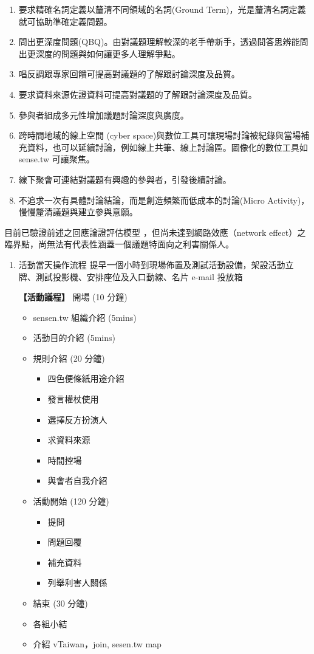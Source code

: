 \documentclass[12pt,a4paper]{article}
\begin{document}
\begin{enumerate}
\begin{enumerate}
\item 要求精確名詞定義以釐清不同領域的名詞(Ground Term)，光是釐清名詞定義就可協助準確定義問題。
\item 問出更深度問題(QBQ)。由對議題理解較深的老手帶新手，透過問答思辨能問出更深度的問題與如何讓更多人理解爭點。
\item 唱反調跟專家回饋可提高對議題的了解跟討論深度及品質。
\item 要求資料來源佐證資料可提高對議題的了解跟討論深度及品質。
\item 參與者組成多元性增加議題討論深度與廣度。
\item 跨時間地域的線上空間 (cyber space)與數位工具可讓現場討論被紀錄與當場補充資料，也可以延續討論，例如線上共筆、線上討論區。圖像化的數位工具如 sense.tw 可讓聚焦。
\item 線下聚會可連結對議題有興趣的參與者，引發後續討論。
\item 不追求一次有具體討論結論，而是創造頻繁而低成本的討論(Micro Activity)，慢慢釐清議題與建立參與意願。
\end{enumerate}

目前已驗證前述之回應論證評估模型 \citep{guba01} ，但尚未達到網路效應（network effect）之臨界點，尚無法有代表性涵蓋一個議題特面向之利害關係人。
\begin{enumerate}
\item 活動當天操作流程
\label{sec:org813973f}
提早一個小時到現場佈置及測試活動設備，架設活動立牌、測試投影機、安排座位及入口動線、名片 e-mail 投放箱

\textbf{【活動議程】}
開場 (10 分鐘)
\begin{itemize}
\item sensen.tw 組織介紹 (5mins)
\item 活動目的介紹 (5mins)
\item 規則介紹 (20 分鐘)
\begin{itemize}
\item 四色便條紙用途介紹
\item 發言權杖使用
\item 選擇反方扮演人
\item 求資料來源
\item 時間控場
\item 與會者自我介紹
\end{itemize}
\item 活動開始 (120 分鐘)
\begin{itemize}
\item 提問
\item 問題回覆
\item 補充資料
\item 列舉利害人關係
\end{itemize}
\item 結束 (30 分鐘)
\item 各組小結
\item 介紹 vTaiwan，join, sesen.tw map
\end{itemize}


\end{enumerate}
\end{enumerate}
\end{document}
